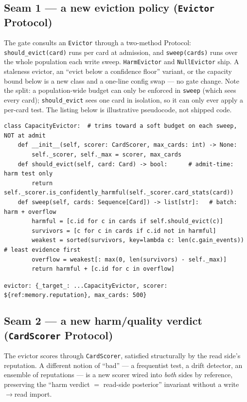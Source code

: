 \documentclass[11pt]{article}
\newcommand{\code}[1]{\texttt{\small #1}}
\begin{document}
\subsection{Seam 1 --- a new eviction policy (\code{Evictor} Protocol)}

The gate consults an \code{Evictor} through a two-method Protocol:
\code{should\_evict(card)} runs per card at admission, and \code{sweep(cards)} runs
over the whole population each write sweep. \code{HarmEvictor} and \code{NullEvictor}
ship. A staleness evictor, an ``evict below a confidence floor'' variant, or the
capacity bound below is a new class and a one-line config swap --- no gate change.
Note the split: a population-wide budget can only be enforced in \code{sweep} (which
sees every card); \code{should\_evict} sees one card in isolation, so it can only ever
apply a per-card test. The listing below is illustrative pseudocode, not shipped code.

\begin{lstlisting}[style=py]
class CapacityEvictor:  # trims toward a soft budget on each sweep, NOT at admit
    def __init__(self, scorer: CardScorer, max_cards: int) -> None:
        self._scorer, self._max = scorer, max_cards
    def should_evict(self, card: Card) -> bool:      # admit-time: harm test only
        return self._scorer.is_confidently_harmful(self._scorer.card_stats(card))
    def sweep(self, cards: Sequence[Card]) -> list[str]:   # batch: harm + overflow
        harmful = [c.id for c in cards if self.should_evict(c)]
        survivors = [c for c in cards if c.id not in harmful]
        weakest = sorted(survivors, key=lambda c: len(c.gain_events))  # least evidence first
        overflow = weakest[: max(0, len(survivors) - self._max)]
        return harmful + [c.id for c in overflow]
\end{lstlisting}

\begin{center}\code{evictor: \{\_target\_: ...CapacityEvictor, scorer: \$\{ref:memory.reputation\}, max\_cards: 500\}}\end{center}

\subsection{Seam 2 --- a new harm/quality verdict (\code{CardScorer} Protocol)}

The evictor scores through \code{CardScorer}, satisfied structurally by the read
side's reputation. A different notion of ``bad'' --- a frequentist test, a
drift detector, an ensemble of reputations --- is a new scorer wired into
\emph{both} sides by reference, preserving the ``harm verdict $=$ read-side
posterior'' invariant without a write$\to$read import.
\end{document}
